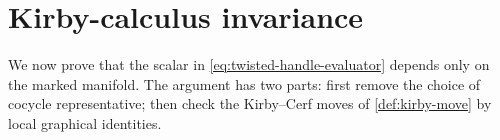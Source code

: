 \section{Kirby-calculus invariance}
\label{sec:kirby-invariance}

We now prove that the scalar in \eqref{eq:twisted-handle-evaluator} depends
only on the marked manifold.  The argument has two parts: first remove the
choice of cocycle representative; then check the Kirby--Cerf moves of
\cref{def:kirby-move} by local graphical identities.


